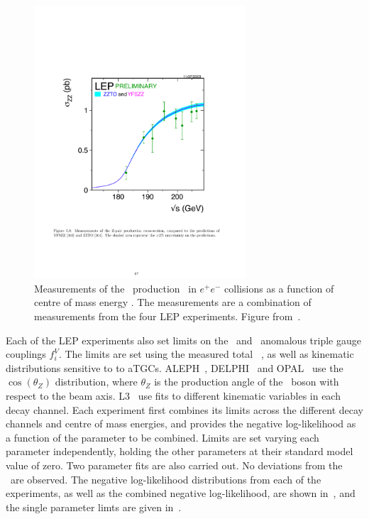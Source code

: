 \begin{figure}
\centering
        \includegraphics[width=0.7\textwidth]{lep_cx}
    \caption[Measurements of the \ZZ\ production \cx\ in  $e^+e^-$
    collisions at LEP as a function of centre of mass energy \sqrts.]{Measurements of the \ZZ\ production \cx\ in  $e^+e^-$
    collisions as a function of centre of mass energy \sqrts. The
    measurements are a combination of measurements from the four LEP
    experiments. Figure from~\cite{bib:LEPEW2006}.}
    \label{fig:lep-cx}
\end{figure}

Each of the LEP experiments also set limits on the \ZZZ\ and \ZZg\ anomalous
triple gauge couplings $f_{i}^{V}$. The limits are set using the measured total
\ZZ\ \cx, as well as kinematic distributions sensitive to to aTGCs.
ALEPH~\cite{Schael:1166743}, DELPHI~\cite{Bambade:1002930} and
OPAL~\cite{Abbiendi:2000kq} use the $\cos(\theta_{Z})$ distribution, where
$\theta_{Z}$ is the production angle of the \Z\ boson with respect to the beam
axis. L3~\cite{Acciarri:1999ug} use fits to different kinematic variables in
each decay channel. Each experiment first combines its limits across the different
decay channels and centre of mass energies, and provides the negative
log-likelihood as a function of the parameter to be combined. Limits are set
varying each parameter independently, holding the other parameters at their
standard model value of zero. Two parameter
fits are also carried out. No deviations from the \sm\ are observed. The
negative log-likelihood distributions from each of the experiments, as well as the
combined negative log-likelihood, are shown in~, and the single
parameter limts are given in~.

